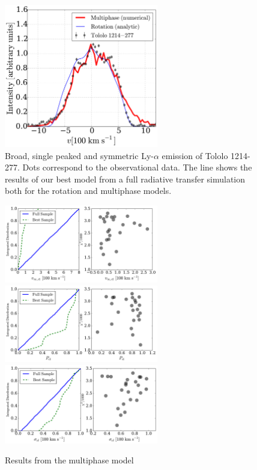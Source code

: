 \documentclass[a4,useAMS,usenatbib,usegraphicx]{mn2e}
\newcommand{\tol}{Tololo 1214-277}
\begin{document}
\begin{figure}
\begin{center}
\includegraphics[width=0.6\textwidth]{CLARA-TOL-main.pdf}
\caption{Broad, single peaked and symmetric Ly-$\alpha$ emission of \tol.
  Dots correspond to the observational data. The line shows the results
of our best model from a full radiative transfer simulation both for
the rotation and multiphase models.} 
\end{center}
\end{figure}

\begin{figure}
\begin{center}
  \includegraphics[width=0.6\textwidth]{vinf_cl.pdf}
  \includegraphics[width=0.6\textwidth]{P_cl.pdf}
  \includegraphics[width=0.6\textwidth]{sigma_cl.pdf}
\caption{Results from the multiphase model\label{multiphaseresults}}
\end{center}
\end{figure}
\end{document}
